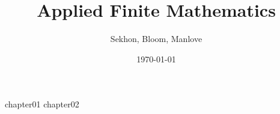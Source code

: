\documentclass[12pt]{book}
\begin{document}

\frontmatter
\title{Applied Finite Mathematics}
\author{Sekhon, Bloom, Manlove}
\date{\today}
\maketitle
\tableofcontents

\mainmatter
{chapter01}
{chapter02}
% 

\backmatter
\end{document}
